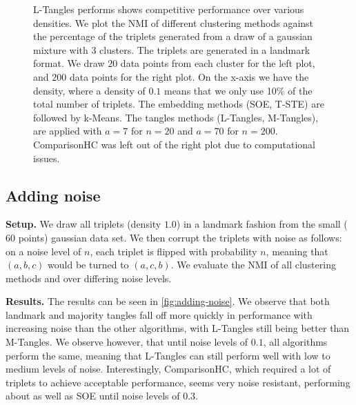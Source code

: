 \onecolumn
\begin{figure}[ht]
    \centering
    \caption{
        L-Tangles performs shows competitive performance over various densities. We plot the NMI of different clustering methods against the percentage of the triplets generated from 
        a draw of a gaussian mixture with $3$ clusters. The triplets are generated in a landmark format.
        We draw $20$ data points from each cluster for the left plot, and $200$ data points for the right plot.
        On the x-axis we have the density, where a density of $0.1$ means that we only use 10\% of the total number of triplets. The embedding methods (SOE, T-STE) are 
        followed by k-Means. The tangles methods (L-Tangles, M-Tangles), are applied with $a=7$ for $n=20$ and $a=70$ for $n=200$. 
        ComparisonHC was left out of the right plot due to computational issues.}
    \label{fig:density-change}
\end{figure}


\subsection{Adding noise}\label{sec:adding-noise}
\textbf{Setup.}
We draw all triplets (density $1.0$) in a landmark fashion from the small ($60$ points) gaussian data set. We then corrupt the triplets with noise as follows:
on a noise level of $n$, each triplet is flipped with probability $n$, meaning that $(a,b,c)$ would be turned to $(a,c,b)$.
We evaluate the NMI of all clustering methods and over differing noise levels.

\noindent
\textbf{Results.}
The results can be seen in \autoref{fig:adding-noise}.
We observe that both landmark and majority tangles fall off more quickly in performance with increasing noise 
than the other algorithms, with L-Tangles still being better than M-Tangles. 
We observe however, that until noise levels of $0.1$, all algorithms perform the same, meaning that L-Tangles can still perform well with low to medium levels of noise. Interestingly, ComparisonHC, which 
required a lot of triplets to achieve acceptable performance, seems 
very noise resistant, performing about as well as SOE until noise levels of 0.3.

